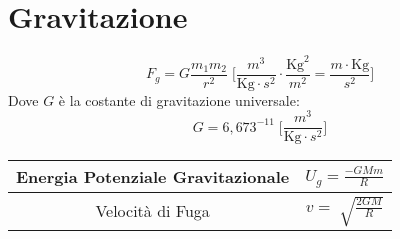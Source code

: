 \chapter*{Gravitazione}

\begin{equation*}
    F_g = G\frac{m_1m_2}{r^2} \; \Bigg[\frac{m^3}{\text{Kg}\cdot s^2} \cdot
    \frac{\text{Kg}^2}{m^2} = \frac{m \cdot \text{Kg}}{s^2} \Bigg]
\end{equation*}
Dove $G$ è la costante di gravitazione universale:
\begin{equation*}
    G = 6,673^{-11} \;\Bigg[\frac{m^3}{\text{Kg}\cdot s^2}\Bigg]
\end{equation*}

\begingroup
\setlength{\tabcolsep}{20pt} %
\renewcommand{\arraystretch}{2} %
\begin{tabular}{|c|c|}
    \hline Energia Potenziale Gravitazionale &
        $
        U_g = \frac{-GMm}{R}
        $
        \\

    \hline Velocità di Fuga &
        $
        v = \sqrt[]{\frac{2GM}{R}}
        $
        \\
    \hline
\end{tabular}
\endgroup